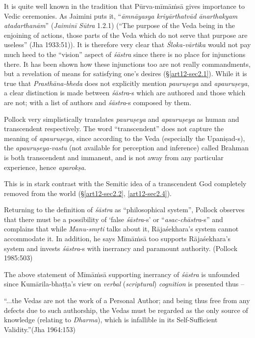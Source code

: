 It is quite well known in the tradition that Pūrva-mīmāṁsā gives importance to Vedic ceremonies. As Jaimini puts it, ``{\sl āmnāyasya kriyārthatvād ānarthakyam atadarthanām}'' ({\sl Jaiminī Sūtra} 1.2.1) (``The purpose of the Veda being in the enjoining of actions, those parts of the Veda which do not serve that purpose are useless'' (Jha 1933:51)). It is therefore very clear that {\sl Śloka-vārtika} would not pay much heed to the ``vision'' aspect of {\sl śāstra} since there is no place for injunctions there. It has been shown how these injunctions too are not really commandments, but a revelation of means for satisfying one's desires (\S\ref{art12-sec2.1}). While it is true that {\sl Prasthāna-bheda} does not explicitly mention {\sl pauruṣeya} and {\sl apauruṣeya}, a clear distinction is made between {\sl śāstra}-s which are authored and those which are not; with a list of authors and {\sl śāstra}-s composed by them. 

Pollock very simplistically translates {\sl pauruṣeya} and {\sl apauruṣeya}  as human and transcendent respectively. The word ``transcendent'' does not capture the meaning of {\sl apauruṣeya}, since according to the Veda (especially the Upaniṣad-s), the {\sl apauruṣeya-vastu} (not available for perception and inference) called Brahman is both transcendent and immanent, and is not away from any particular experience, hence {\sl aparokṣa}.

This is in stark contrast with the Semitic idea of a transcendent God completely removed from the world (\S\ref{art12-sec2.2}, \ref{art12-sec2.4}). 

Returning to the deﬁnition of {\sl śāstra} as ``philosophical system'', Pollock observes that there must be a possibility of `false {\sl śāstra}-s' or ``{\sl asac-chāstra}-s'' and complains that while {\sl Manu-smṛti} talks about it, Rājaśekhara's system cannot accommodate it. In addition, he says Mīmāṁsā too supports Rājaśekhara's system and invests {\sl śāstra}-s with inerrancy and paramount authority. (Pollock 1985:503)

The above statement of Mīmāṁsā supporting inerrancy of {\sl śāstra} is unfounded since Kumārila-bhaṭṭa's view on {\sl verbal} ({\sl scriptural}) {\sl cognition} is presented thus --
\begin{myquote}
“...the Vedas are not the work of a Personal Author; and being thus free from any defects due to such authorship, the Vedas must be regarded as the only source of knowledge (relating to {\sl Dharma}), which is infallible in its Self-Sufficient Validity.''\hfill (Jha 1964:153)
\end{myquote}

